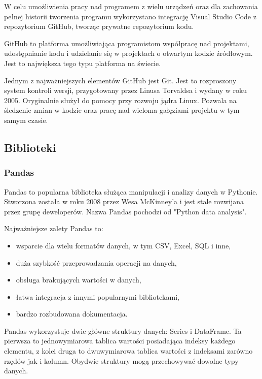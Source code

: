 \documentclass[12pt,twoside]{article}
\begin{document}
W celu umożliwienia pracy nad programem z wielu urządzeń oraz dla zachowania pełnej historii
tworzenia programu wykorzystano integrację Visual Studio Code z repozytorium GitHub, tworząc
prywatne repozytorium kodu. \cite{github}

GitHub to platforma umożliwiająca programistom współpracę nad projektami, udostępnianie kodu i
udzielanie się w projektach o otwartym kodzie źródłowym. Jest to największa tego typu platforma na świecie. \cite{github2}

Jednym z najważniejszych elementów GitHub jest Git. Jest to rozproszony system kontroli wersji,
przygotowany przez Linusa Torvaldsa i wydany w roku 2005. Oryginalnie służył do pomocy przy rozwoju jądra Linux.
Pozwala na śledzenie zmian w kodzie oraz pracę nad wieloma gałęziami projektu w tym samym czasie. \cite{git}

\subsection{Biblioteki}
\subsubsection{Pandas}

Pandas to popularna biblioteka służąca manipulacji i analizy danych w Pythonie.
Stworzona została w roku 2008 przez Wesa McKinney'a i jest stale rozwijana przez grupę deweloperów.
Nazwa Pandas pochodzi od "Python data analysis". \cite{pandas}

Najważniejsze zalety Pandas to:

\begin{itemize}[label=-,labelsep=0.4cm, leftmargin=1.25cm]
    \item wsparcie dla wielu formatów danych, w tym CSV, Excel, SQL i inne,
    \item duża szybkość przeprowadzania operacji na danych,
    \item obsługa brakujących wartości w danych,
    \item łatwa integracja z innymi popularnymi bibliotekami,
    \item bardzo rozbudowana dokumentacja.
\end{itemize}

Pandas wykorzystuje dwie główne struktury danych: Series i DataFrame.
Ta pierwsza to jednowymiarowa tablica wartości posiadająca indeksy każdego elementu,
z kolei druga to dwuwymiarowa tablica wartości z indeksami zarówno rzędów jak i kolumn.
Obydwie struktury mogą przechowywać dowolne typy danych. \cite{pandas2}
\end{document}

